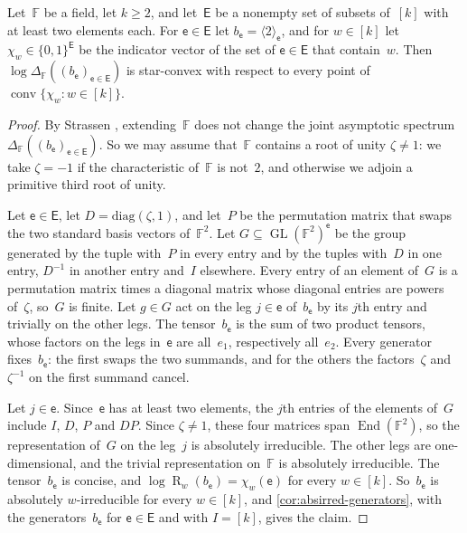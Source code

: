 \documentclass[11pt,letterpaper]{article}
\DeclareMathOperator{\tensorrank}{R}
\newcommand{\FF}{\mathbb{F}}
\DeclareMathOperator{\GL}{GL}
\DeclareMathOperator{\End}{End}
\DeclareMathOperator{\conv}{conv}
\begin{document}
\begin{corollary}\label{cor:hypergraph-tensors-star}
Let~$\FF$ be a field, let $k \geq 2$, and let~$\mathsf{E}$ be a nonempty set of subsets of~$[k]$ with at least two elements each. For $\mathsf{e} \in \mathsf{E}$ let $b_{\mathsf{e}} = \langle 2 \rangle_{\mathsf{e}}$, and for $w \in [k]$ let $\chi_w \in \{0,1\}^{\mathsf{E}}$ be the indicator vector of the set of $\mathsf{e} \in \mathsf{E}$ that contain~$w$. Then $\log \Delta_\FF((b_{\mathsf{e}})_{\mathsf{e} \in \mathsf{E}})$ is star-convex with respect to every point of $\conv\{\chi_w : w \in [k]\}$.
\end{corollary}
\begin{proof}
By Strassen \cite[Theorem~3.10]{strassen1988asymptotic}, extending~$\FF$ does not change the joint asymptotic spectrum~$\Delta_\FF((b_{\mathsf{e}})_{\mathsf{e} \in \mathsf{E}})$. So we may assume that~$\FF$ contains a root of unity $\zeta \neq 1$: we take $\zeta = -1$ if the characteristic of~$\FF$ is not~$2$, and otherwise we adjoin a primitive third root of unity.

Let $\mathsf{e} \in \mathsf{E}$, let $D = \mathrm{diag}(\zeta, 1)$, and let~$P$ be the permutation matrix that swaps the two standard basis vectors of~$\FF^2$. Let $G \subseteq \GL(\FF^2)^{\mathsf{e}}$ be the group generated by the tuple with~$P$ in every entry and by the tuples with~$D$ in one entry, $D^{-1}$ in another entry and~$I$ elsewhere. Every entry of an element of~$G$ is a permutation matrix times a diagonal matrix whose diagonal entries are powers of~$\zeta$, so~$G$ is finite. Let $g \in G$ act on the leg $j \in \mathsf{e}$ of~$b_{\mathsf{e}}$ by its $j$th entry and trivially on the other legs. The tensor~$b_{\mathsf{e}}$ is the sum of two product tensors, whose factors on the legs in~$\mathsf{e}$ are all~$e_1$, respectively all~$e_2$. Every generator fixes~$b_{\mathsf{e}}$: the first swaps the two summands, and for the others the factors~$\zeta$ and~$\zeta^{-1}$ on the first summand cancel.

Let $j \in \mathsf{e}$. Since~$\mathsf{e}$ has at least two elements, the $j$th entries of the elements of~$G$ include $I$, $D$, $P$ and $DP$. Since $\zeta \neq 1$, these four matrices span $\End(\FF^2)$, so the representation of~$G$ on the leg~$j$ is absolutely irreducible. The other legs are one-dimensional, and the trivial representation on~$\FF$ is absolutely irreducible. The tensor~$b_{\mathsf{e}}$ is concise, and $\log \tensorrank_w(b_{\mathsf{e}}) = \chi_w(\mathsf{e})$ for every $w \in [k]$. So~$b_{\mathsf{e}}$ is absolutely $w$-irreducible for every $w \in [k]$, and \cref{cor:absirred-generators}, with the generators~$b_{\mathsf{e}}$ for $\mathsf{e} \in \mathsf{E}$ and with $I = [k]$, gives the claim.
\end{proof}
\end{document}
